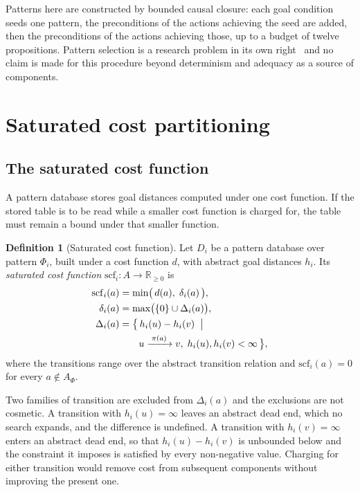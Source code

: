 \documentclass[10pt,twocolumn,a4paper]{article}
\theoremstyle{plain}
\theoremstyle{definition}
\newtheorem{definition}[theorem]{Definition}
\theoremstyle{remark}
\newcommand{\scf}{\mathrm{scf}}
\newcommand{\proj}{\pi}
\newcommand{\R}{\mathbb{R}}
\begin{document}
Patterns here are constructed by bounded causal closure: each goal condition
seeds one pattern, the preconditions of the actions achieving the seed are
added, then the preconditions of the actions achieving those, up to a budget of
twelve propositions. Pattern selection is a research problem in its own
right~\cite{haslum2007,seipp2018} and no claim is made for this procedure
beyond determinism and adequacy as a source of components.

\section{Saturated cost partitioning}
\label{sec:saturation}

\subsection{The saturated cost function}

A pattern database stores goal distances computed under one cost function. If
the stored table is to be read while a smaller cost function is charged for,
the table must remain a bound under that smaller function.

\begin{definition}[Saturated cost function]
\label{def:scf}
Let $D_i$ be a pattern database over pattern $\Phi_i$, built under a cost
function $d$, with abstract goal distances $h_i$. Its \emph{saturated cost
function} $\scf_i : A \to \R_{\ge 0}$ is
\begin{align*}
  \scf_i(a)   &= \min\bigl(\, d(a),\; \delta_i(a) \,\bigr), \\
  \delta_i(a) &= \max\bigl( \{0\} \cup \Delta_i(a) \bigr), \\
  \Delta_i(a) &= \bigl\{\, h_i(u) - h_i(v) \;\bigm|\; \\
              &\qquad u \xrightarrow{\;\proj(a)\;} v,\;
                       h_i(u), h_i(v) < \infty \,\bigr\},
\end{align*}
where the transitions range over the abstract transition relation and
$\scf_i(a) = 0$ for every $a \notin A_\Phi$.
\end{definition}

Two families of transition are excluded from $\Delta_i(a)$ and the exclusions
are not cosmetic. A transition with $h_i(u) = \infty$ leaves an abstract dead
end, which no search expands, and the difference is undefined. A transition
with $h_i(v) = \infty$ enters an abstract dead end, so that $h_i(u) - h_i(v)$
is unbounded below and the constraint it imposes is satisfied by every
non-negative value. Charging for either transition would remove cost from
subsequent components without improving the present one.
\end{document}
